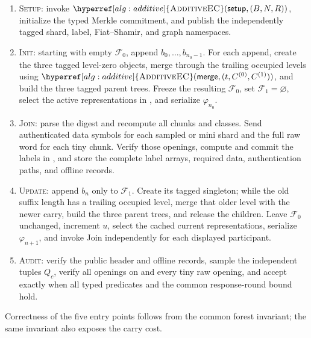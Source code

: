 \documentclass[11pt]{article}
\newenvironment{fminipage}%
  {\begin{Sbox}\begin{minipage}}%
  {\end{minipage}\end{Sbox}\fbox{\TheSbox}}
\newenvironment{algbox}[0]{%
\vskip 0.2in
\noindent
\begin{fminipage}{6.3in}
}{%
\end{fminipage}
\vskip 0.2in
}
\begin{document}
\begin{algbox}
\begin{enumerate}[leftmargin=*,label=\arabic*.]
 \item \textsc{Setup}: invoke
 $\hyperref[alg:additive]{\textsc{AdditiveEC}}(\mathsf{setup},(B,N,R))$,
 initialize the typed Merkle
 commitment, and publish the independently tagged shard, label,
 Fiat--Shamir, and graph namespaces.
 \item \textsc{Init}: starting with empty $\mathcal F_0$, append
 $b_0,\ldots,b_{n_0-1}$.  For each append, create the three tagged level-zero
 objects, merge through the trailing occupied levels using
 $\hyperref[alg:additive]{\textsc{AdditiveEC}}
 (\mathsf{merge},\allowbreak(t,\allowbreak C^{(0)},\allowbreak C^{(1)}))$,
 and build the
 three tagged parent trees.  Freeze the resulting $\mathcal F_0$, set
 $\mathcal F_1=\varnothing$, select the active representations in
 , and serialize $\varphi_{n_0}$.
 \item \textsc{Join}: parse the digest and recompute all chunks and classes.
 Send authenticated data symbols for each sampled or mini shard and the full
 raw word for each tiny chunk.  Verify those openings, compute and commit the
 labels in , and store the complete label arrays, required
 data, authentication paths, and offline records.
 \item \textsc{Update}: append $b_n$ only to $\mathcal F_1$.  Create its
 tagged singleton; while the old suffix length has a trailing occupied level,
 merge that older level with the newer carry, build the three parent trees,
 and release the children.  Leave $\mathcal F_0$ unchanged, increment $u$,
 select the cached current representations, serialize $\varphi_{n+1}$, and
 invoke Join independently for each displayed participant.
 \item \textsc{Audit}: verify the public header and offline records, sample
 the independent tuples $Q_c$, verify all openings on 
 and every tiny raw opening, and accept exactly when all typed predicates and
 the common response-round bound hold.
\end{enumerate}
\end{algbox}

Correctness of the five entry points follows from the common forest invariant;
the same invariant also exposes the carry cost.
\end{document}
